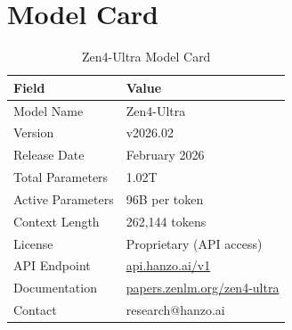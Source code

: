 \documentclass[11pt,a4paper]{article}
\begin{document}



\appendix

\section{Model Card}

\begin{table}[H]
\centering
\begin{tabular}{ll}
\toprule
\textbf{Field} & \textbf{Value} \\
\midrule
Model Name       & Zen4-Ultra \\
Version          & v2026.02 \\
Release Date     & February 2026 \\
Total Parameters & 1.02T \\
Active Parameters& 96B per token \\
Context Length   & 262,144 tokens \\
License          & Proprietary (API access) \\
API Endpoint     & \href{https://api.hanzo.ai/v1}{api.hanzo.ai/v1} \\
Documentation    & \href{https://papers.zenlm.org/zen4-ultra}{papers.zenlm.org/zen4-ultra} \\
Contact          & research@hanzo.ai \\
\bottomrule
\end{tabular}
\caption{Zen4-Ultra Model Card}
\end{table}
\end{document}
